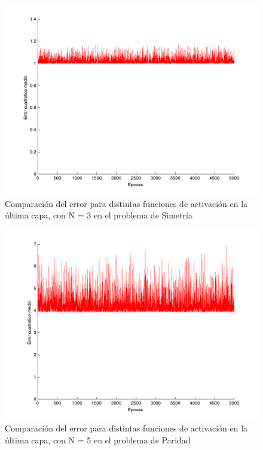 \documentclass{sig-alternate}
\begin{document}
\begin{figure}[!ht]
	\includegraphics[scale=0.5]{images/sym_lineal_N3_eta02.png}
  \caption{Comparaci\'on del error para distintas funciones de activaci\'on en la \'ultima capa, con N = 3 en el problema de Simetr\'ia}
  \label{fig:symN3_LINEAL}
\end{figure}

\begin{figure}[!ht]
	\includegraphics[scale=0.5]{images/par_lineal_N5_eta02.png}
  \caption{Comparaci\'on del error para distintas funciones de activaci\'on en la \'ultima capa, con N = 5 en el problema de Paridad}
  \label{fig:parN5_LINEAL}
\end{figure}
\end{document}
